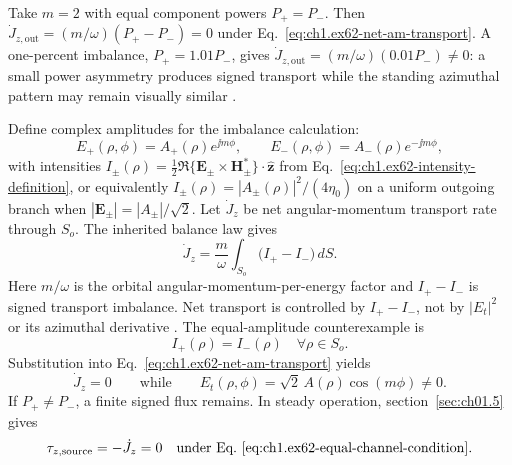 \begin{example}
\label{ex:ch1.counter-rotating-numeric}
Take $m=2$ with equal component powers $P_+=P_-$. Then $\dot J_{z,\mathrm{out}}=(m/\omega)(P_+-P_-)=0$ under Eq.~\eqref{eq:ch1.ex62-net-am-transport}. A one-percent imbalance, $P_+=1.01P_-$, gives $\dot J_{z,\mathrm{out}}=(m/\omega)(0.01P_-)\neq0$: a small power asymmetry produces signed transport while the standing azimuthal pattern may remain visually similar \cite{allen1992,stratton1941}.
\end{example}

Define complex amplitudes for the imbalance calculation:
\begin{equation}
\label{eq:ch1.ex62-channel-amplitudes}
E_{+}(\rho,\phi)=A_+(\rho)e^{\jj m\phi},\qquad
E_{-}(\rho,\phi)=A_-(\rho)e^{-\jj m\phi},
\end{equation}
with intensities $I_\pm(\rho)=\tfrac12\Re\{\mathbf{E}_\pm\times\mathbf{H}_\pm^*\}\cdot\hat{\mathbf{z}}$
from Eq.~\eqref{eq:ch1.ex62-intensity-definition}, or equivalently
$I_\pm(\rho)=|A_\pm(\rho)|^2/(4\eta_0)$ on a uniform outgoing branch when $|\mathbf{E}_\pm|=|A_\pm|/\sqrt{2}$. Let
\(\dot J_z\) be net angular-momentum transport rate through \(S_o\). The inherited
balance law gives
\begin{equation}
\label{eq:ch1.ex62-net-am-transport}
\dot J_z
=
\frac{m}{\omega}
\int_{S_o}\!\big(I_+-I_-\big)\,dS.
\end{equation}
Here \(m/\omega\) is the orbital angular-momentum-per-energy factor and \(I_+-I_-\) is
signed transport imbalance. Net transport is controlled by \(I_+-I_-\), not by \(|E_t|^2\) or its azimuthal derivative \cite{stratton1941}. The equal-amplitude counterexample is
\begin{equation}
\label{eq:ch1.ex62-equal-channel-condition}
I_+(\rho)=I_-(\rho)\quad\forall \rho\in S_o.
\end{equation}
Substitution into Eq.~\eqref{eq:ch1.ex62-net-am-transport} yields
\begin{equation}
\label{eq:ch1.ex62-zero-transport-result}
\dot J_z=0
\qquad\text{while}\qquad
E_t(\rho,\phi)=\sqrt{2}\,A(\rho)\cos(m\phi)\neq 0.
\end{equation}
If \(P_+\neq P_-\), a finite signed flux remains. In steady operation, section~\ref{sec:ch01.5} gives
\begin{equation}
\label{eq:ch1.ex62-zero-torque-prediction}
\tau_{z,\mathrm{source}}
=
-\dot J_z
=
0
\quad\text{under Eq.~\eqref{eq:ch1.ex62-equal-channel-condition}}.
\end{equation}
